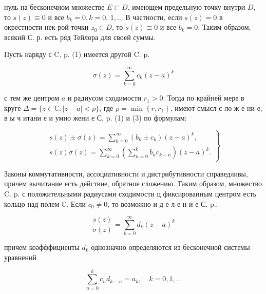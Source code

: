 \documentclass[10pt]{article}
\begin{document}
нуль на бесконечном множестве $E \subset D$, имеющем предельную точку внутри $D$, то $s(z) \equiv 0$ и все $b_{k}=0, k=0$, $1, \ldots$ В частности, если $s(z)=0$ в окрестности нек-рой точки $z_{0} \in D$, то $s(z) \equiv 0$ и все $b_{k}=0$. Таким образом, всякий С. р. есть ряд Тейлора для своей суммы.



Пусть наряду с C. p. (1) имеется другой C. p.



\[

\sigma(z)=\sum_{k=0}^{\infty} c_{k}(z-a)^{k}

\]



с тем же центром $a$ и радиусом сходимости $r_{1}>0$. Тогда по крайней мере в круге $\Delta=\{z \in \mathbb{C}:|z-a|<\rho\}$, где $\rho=\min \left\{r, r_{1}\right\}$, имеют смысл с ло ж е ни е, в ы ч итани е и умно жени е С. p. (1) и (3) по формулам:



\[

\left.\begin{array}{l}

s(z) \pm \sigma(z)=\sum_{k=0}^{\infty}\left(b_{k} \pm c_{k}\right)(z-a)^{k}, \\

s(z) \sigma(z)=\sum_{k=0}^{\infty}\left(\sum_{n=0}^{k} b_{n} c_{k-n}\right)(z-a)^{k} .

\end{array}\right\}

\]



Законы коммутативности, ассоциативности и дистрибутивности справедливы, причем вычитание есть действие, обратное сложению. Таким образом, множество C. p. с положительными радиусами сходимости ц фиксированным центром есть кольцо над полем $\mathbb{C}$. Если $c_{0} \neq 0$, то возможно и д е л е н и е С. p.:



\[

\frac{s(z)}{\sigma(z)}=\sum_{k=0}^{\infty} d_{k}(z-a)^{k}

\]



причем коәфффициенты $d_{k}$ однозначно определяются из бесконечной системы уравнений



\[

\sum_{n=0}^{k} c_{n} d_{k-n}=a_{k}, \quad k=0,1, \ldots

\]
\end{document}
